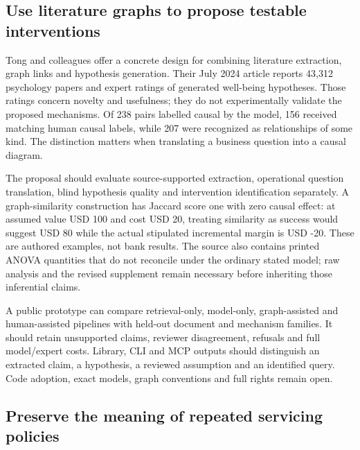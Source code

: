 \hypertarget{use-literature-graphs-to-propose-testable-interventions}{%
\subsection{Use literature graphs to propose testable
interventions}\label{use-literature-graphs-to-propose-testable-interventions}}

Tong and colleagues offer a concrete design for combining literature
extraction, graph links and hypothesis generation. Their July 2024
article reports 43,312 psychology papers and expert ratings of generated
well-being hypotheses. Those ratings concern novelty and usefulness;
they do not experimentally validate the proposed mechanisms. Of 238
pairs labelled causal by the model, 156 received matching human causal
labels, while 207 were recognized as relationships of some kind. The
distinction matters when translating a business question into a causal
diagram. \citep{exec20_hypothesis_generation}

The proposal should evaluate source-supported extraction, operational
question translation, blind hypothesis quality and intervention
identification separately. A graph-similarity construction has Jaccard
score one with zero causal effect: at assumed value USD 100 and cost USD
20, treating similarity as success would suggest USD 80 while the actual
stipulated incremental margin is USD -20. These are authored examples,
not bank results. The source also contains printed ANOVA quantities that
do not reconcile under the ordinary stated model; raw analysis and the
revised supplement remain necessary before inheriting those inferential
claims. \citep{exec20_hypothesis_reference,exec20_hypothesis_generation}

A public prototype can compare retrieval-only, model-only,
graph-assisted and human-assisted pipelines with held-out document and
mechanism families. It should retain unsupported claims, reviewer
disagreement, refusals and full model/expert costs. Library, CLI and MCP
outputs should distinguish an extracted claim, a hypothesis, a reviewed
assumption and an identified query. Code adoption, exact models, graph
conventions and full rights remain open.
\citep{exec20_hypothesis_generation,exec20_hypothesis_reference}

\hypertarget{preserve-the-meaning-of-repeated-servicing-policies}{%
\subsection{Preserve the meaning of repeated servicing
policies}\label{preserve-the-meaning-of-repeated-servicing-policies}}

